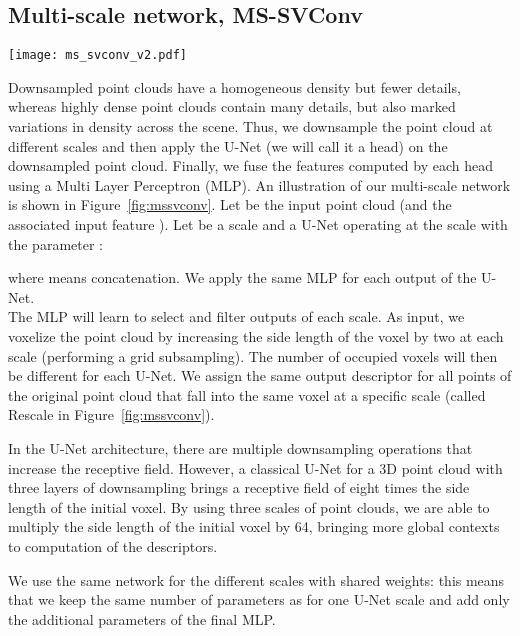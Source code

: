 \documentclass[10pt,twocolumn,letterpaper]{article}
\begin{document}
\subsection{Multi-scale network, MS-SVConv}
\begin{figure*}
    \centering
    \texttt{[image: ms\_svconv\_v2.pdf]}
    \caption{Architecture of the proposed Multi-Scale Sparse Voxel Convolution (MS-SVConv) for registration. The point cloud is downsampled at each scale with a grid subsampling that increases the side length of the voxel by 2 each time.}
    \label{fig:mssvconv}
\end{figure*}
Downsampled point clouds have a homogeneous density but fewer details, whereas highly dense point clouds contain many details, but also marked variations in density across the scene.
Thus, we downsample the point cloud at different scales and then apply the U-Net (we will call it a head) on the downsampled point cloud. Finally, we fuse the features computed by each head using a Multi Layer Perceptron (MLP). An illustration of our multi-scale network is shown in Figure~\ref{fig:mssvconv}.
Let  be the input point cloud  (and the associated input feature ).
Let  be a scale and  a U-Net operating at the scale  with the parameter : 

where  means concatenation. We apply the same MLP for each output of the U-Net.\\
The MLP will learn to select and filter outputs of each scale.
As input, we voxelize the point cloud by increasing the side length of the voxel by two at each scale (performing a grid subsampling). The number of occupied voxels will then be different for each U-Net. 
We assign the same output descriptor for all points of the original point cloud that fall into the same voxel at a specific scale (called Rescale in Figure~\ref{fig:mssvconv}).




In the U-Net architecture, there are multiple downsampling operations that increase the receptive field. However, a classical U-Net for a 3D point cloud with three layers of downsampling brings a receptive field of eight times the side length of the initial voxel. By using three scales of point clouds, we are able to multiply the side length of the initial voxel by 64, bringing more global contexts to computation of the descriptors. 

We use the same network for the different scales with shared weights: this means that we keep the same number of parameters as for one U-Net scale and add only the additional parameters of the final MLP.
\end{document}
